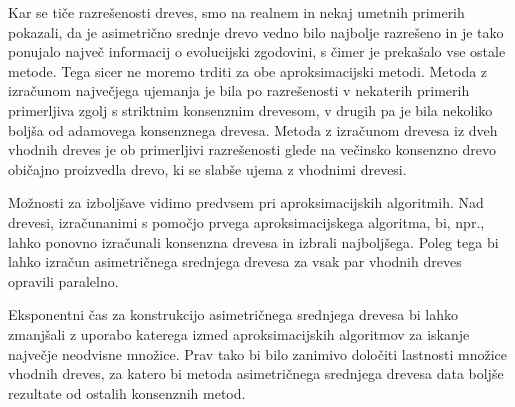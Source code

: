 \documentclass[a4paper, 12pt]{book}
\begin{document}
Kar se tiče razrešenosti dreves, smo na realnem in nekaj umetnih primerih pokazali, da 
je asimetrično srednje drevo vedno bilo najbolje razrešeno in je tako ponujalo največ 
informacij o evolucijski zgodovini, s čimer je prekašalo vse ostale metode. 
Tega sicer ne moremo trditi za obe aproksimacijski metodi. Metoda z izračunom 
največjega ujemanja je bila po razrešenosti v nekaterih primerih primerljiva zgolj 
s striktnim konsenznim drevesom, v drugih pa je bila nekoliko boljša od adamovega 
konsenznega drevesa. Metoda z izračunom drevesa iz dveh vhodnih dreves je ob 
primerljivi razrešenosti glede na večinsko konsenzno drevo običajno proizvedla drevo,
ki se slabše ujema z vhodnimi drevesi. 

Možnosti za izboljšave vidimo predvsem pri aproksimacijskih algoritmih. Nad drevesi,
izračunanimi s pomočjo prvega aproksimacijskega algoritma, bi, npr., lahko ponovno 
izračunali konsenzna drevesa in izbrali najboljšega. Poleg tega bi lahko
izračun asimetričnega srednjega drevesa za vsak par vhodnih dreves opravili paralelno. 

Eksponentni čas za konstrukcijo asimetričnega srednjega drevesa bi lahko zmanjšali z 
uporabo katerega izmed aproksimacijskih algoritmov za iskanje največje neodvisne množice.
Prav tako bi bilo zanimivo določiti lastnosti množice vhodnih dreves, za katero bi 
metoda asimetričnega srednjega drevesa data boljše rezultate od ostalih konsenznih metod.
\end{document}
